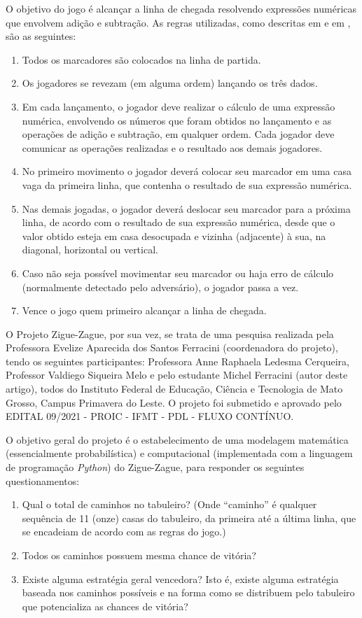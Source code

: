 \documentclass[12pt]{article}
\newcommand{\aspas}[1]{``#1''} %
\begin{document}
O objetivo do jogo é alcançar a linha de chegada resolvendo expressões numéricas que envolvem adição e subtração. As regras utilizadas, como descritas em \cite{silvakodama:2007} e em \cite{unesp:2022}, são as seguintes:

\begin{enumerate}
	\item Todos os marcadores são colocados na linha de partida.
	\item Os jogadores se revezam (em alguma ordem) lançando os três dados.
	\item Em cada lançamento, o jogador deve realizar o cálculo de uma expressão numérica, envolvendo os números que foram obtidos no lançamento e as operações de adição e subtração, em qualquer ordem. Cada jogador deve comunicar as operações realizadas e o resultado aos demais jogadores.
	\item No primeiro movimento o jogador deverá colocar seu marcador em uma casa vaga da primeira linha, que contenha o resultado de sua expressão numérica.
	\item Nas demais jogadas, o jogador deverá deslocar seu marcador para a próxima linha, de acordo com o resultado de sua expressão numérica, desde que o valor obtido esteja em casa desocupada e vizinha (adjacente) à sua, na diagonal, horizontal ou vertical.
	\item Caso não seja possível movimentar seu marcador ou haja erro de cálculo (normalmente detectado pelo adversário), o jogador passa a vez.
	\item Vence o jogo quem primeiro alcançar a linha de chegada.
\end{enumerate}

O Projeto Zigue-Zague, por sua vez, se trata de uma pesquisa realizada pela Professora Evelize Aparecida dos Santos Ferracini (coordenadora do projeto), tendo os seguintes participantes: Professora Anne Raphaela Ledesma Cerqueira, Professor Valdiego Siqueira Melo e pelo estudante Michel Ferracini (autor deste artigo), todos do Instituto Federal de Educação, Ciência e Tecnologia de Mato Grosso, Campus Primavera do Leste. O projeto foi submetido e aprovado pelo EDITAL 09/2021 - PROIC - IFMT - PDL - FLUXO CONTÍNUO.

O objetivo geral do projeto é o estabelecimento de uma modelagem matemática (essencialmente probabilística) e computacional (implementada com a linguagem de programação \textit{Python}) do Zigue-Zague, para responder os seguintes questionamentos:

\begin{enumerate}
	\item Qual o total de caminhos no tabuleiro? (Onde \aspas{caminho} é qualquer sequência de 11 (onze) casas do tabuleiro, da primeira até a última linha, que se encadeiam de acordo com as regras do jogo.)
	\item Todos os caminhos possuem mesma chance de vitória?
	\item Existe alguma estratégia geral vencedora? Isto é, existe alguma estratégia baseada nos caminhos possíveis e na forma como se distribuem pelo tabuleiro que potencializa as chances de vitória?
\end{enumerate}
\end{document}
